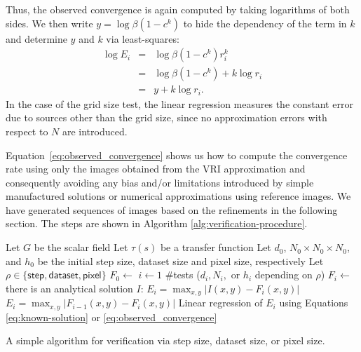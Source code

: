 Thus, the observed convergence is again computed by taking logarithms
of both sides. We then write $y = \log
\beta (  1 - c^k )$ to hide the dependency of the term in $k$
and determine $y$ and $k$ via least-squares:
\begin{eqnarray}
\log E_i &=& \log \beta (  1 - c^k ) r_i^k\\ 
&=& \log \beta (  1 - c^k ) + k \log r_i \\
&=& y + k \log r_i. \label{eq:observed_convergence}
\end{eqnarray}
In the case of the grid size test, the linear regression measures the 
constant error due to sources other than the grid size, since no 
approximation errors with respect to $N$ are introduced.


Equation~\eqref{eq:observed_convergence} shows us how to compute the
convergence rate using only the images obtained from the VRI
approximation and consequently avoiding any bias and/or limitations
introduced by simple manufactured solutions or numerical
approximations using reference images. We have generated sequences of
images based on the refinements in the following section.  The steps
are shown in Algorithm \ref{alg:verification-procedure}.

\begin{algorithm}[b]
\begin{codebox}
\li \Comment Let $G$ be the scalar field
\li \Comment Let $\tau(s)$ be a transfer function
\li \Comment Let $d_0$, $N_0 \times N_0 \times N_0$, and $h_0$ be the initial step size,
\zi  dataset size and pixel size, respectively
\li \Comment Let  $\rho \in \{ \textsf{step}, \textsf{dataset}, \textsf{pixel} \}$
\li $F_0 \gets$ 
\li \For $i \gets 1$ \To $\#$tests
\li     \Do {}($d_i, N_i, \text{ or } h_i$ depending on $\rho$)
\li         $F_i \gets$ 
\li         \If there is an analytical solution $I$:
\li            \Then $E_i = \max_{x,y} | I(x,y) - F_{i}(x,y)|$
\li         \Else  $E_i = \max_{x,y} | F_{i-1}(x,y) - F_{i}(x,y)|$
            \End
       \End
\li Linear regression of $E_i$ using Equations
\eqref{eq:known-solution} or \eqref{eq:observed_convergence}
\end{codebox}
\caption{A simple algorithm for verification via step size, dataset
  size, or pixel size.}
\label{alg:verification-procedure}
\end{algorithm}


